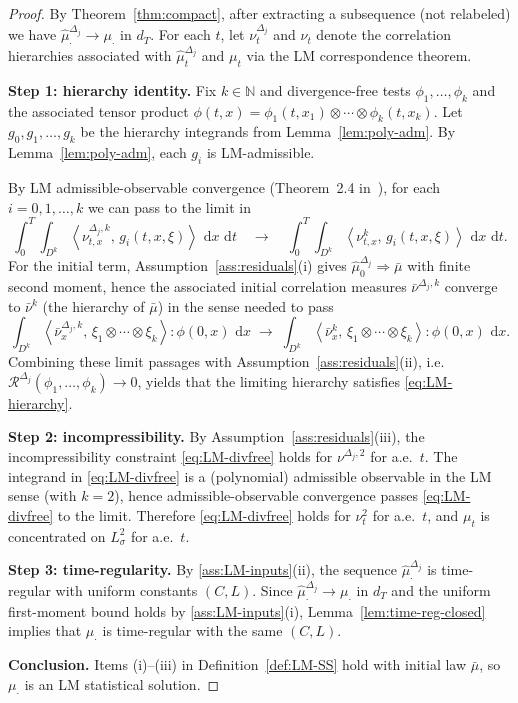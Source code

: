 \documentclass{article}
\numberwithin{equation}{section}
\theoremstyle{plain}
\theoremstyle{definition}
\theoremstyle{remark}
\newcommand{\N}{\mathbb{N}}
\newcommand{\dd}{\,\mathrm{d}}
\newcommand{\ip}[2]{\left\langle #1,\,#2 \right\rangle}
\begin{document}
\begin{proof}
By Theorem~\ref{thm:compact}, after extracting a subsequence (not relabeled) we have
$\widehat\mu^{\Delta_j}_\cdot\to\mu_\cdot$ in $d_T$. For each $t$, let $\nu^{\Delta_j}_t$ and $\nu_t$ denote the correlation
hierarchies associated with $\widehat\mu^{\Delta_j}_t$ and $\mu_t$ via the LM correspondence theorem.

\smallskip
\noindent\textbf{Step 1: hierarchy identity.}
Fix $k\in\N$ and divergence-free tests $\phi_1,\dots,\phi_k$ and the associated tensor product
$\phi(t,x)=\phi_1(t,x_1)\otimes\cdots\otimes\phi_k(t,x_k)$.
Let $g_0,g_1,\dots,g_k$ be the hierarchy integrands from Lemma~\ref{lem:poly-adm}.
By Lemma~\ref{lem:poly-adm}, each $g_i$ is LM-admissible.

By LM admissible-observable convergence (Theorem~2.4 in~\cite{LMP2021}), for each $i=0,1,\dots,k$ we can pass to the limit in
\[
\int_0^T\int_{D^k}\ip{\nu^{\Delta_j,k}_{t,x}}{g_i(t,x,\xi)}\,\dd x\,\dd t
\quad\longrightarrow\quad
\int_0^T\int_{D^k}\ip{\nu^{k}_{t,x}}{g_i(t,x,\xi)}\,\dd x\,\dd t.
\]
For the initial term, Assumption~\ref{ass:residuals}(i) gives $\widehat\mu^{\Delta_j}_0\Rightarrow\bar\mu$ with finite second moment,
hence the associated initial correlation measures $\bar\nu^{\Delta_j,k}$ converge to $\bar\nu^k$ (the hierarchy of $\bar\mu$) in the
sense needed to pass
\[
\int_{D^k}\ip{\bar\nu^{\Delta_j,k}_x}{\xi_1\otimes\cdots\otimes\xi_k}:\phi(0,x)\,\dd x
\;\longrightarrow\;
\int_{D^k}\ip{\bar\nu^{k}_x}{\xi_1\otimes\cdots\otimes\xi_k}:\phi(0,x)\,\dd x.
\]
Combining these limit passages with Assumption~\ref{ass:residuals}(ii), i.e.
$\mathcal R^{\Delta_j}(\phi_1,\dots,\phi_k)\to 0$, yields that the limiting hierarchy satisfies \eqref{eq:LM-hierarchy}.

\smallskip
\noindent\textbf{Step 2: incompressibility.}
By Assumption~\ref{ass:residuals}(iii), the incompressibility constraint \eqref{eq:LM-divfree} holds for $\nu^{\Delta_j,2}$ for a.e.\ $t$.
The integrand in \eqref{eq:LM-divfree} is a (polynomial) admissible observable in the LM sense (with $k=2$), hence admissible-observable
convergence passes \eqref{eq:LM-divfree} to the limit. Therefore \eqref{eq:LM-divfree} holds for $\nu^2_t$ for a.e.\ $t$, and $\mu_t$ is
concentrated on $L^2_\sigma$ for a.e.\ $t$.

\smallskip
\noindent\textbf{Step 3: time-regularity.}
By \cref{ass:LM-inputs}(ii), the sequence $\widehat\mu^{\Delta_j}_\cdot$ is time-regular with uniform constants $(C,L)$.
Since $\widehat\mu^{\Delta_j}_\cdot\to\mu_\cdot$ in $d_T$ and the uniform first-moment bound holds by \cref{ass:LM-inputs}(i),
Lemma~\ref{lem:time-reg-closed} implies that $\mu_\cdot$ is time-regular with the same $(C,L)$.

\smallskip
\noindent\textbf{Conclusion.}
Items (i)--(iii) in Definition~\ref{def:LM-SS} hold with initial law $\bar\mu$, so $\mu_\cdot$ is an LM statistical solution.
\end{proof}
\end{document}

